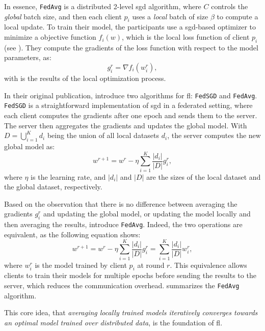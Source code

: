 In essence, \texttt{FedAvg} is a distributed 2-level \gls{sgd} algorithm, where $C$ controls the \emph{global} batch size, and then each client $p_i$ uses a \emph{local} batch of size $\beta$ to compute a local update.
To train their model, the participants use a \gls{sgd}-based optimizer to minimize a objective function $f_i(w)$, which is the local loss function of client $p_i$ (see ).
They compute the gradients of the loss function with respect to the model parameters, as:
\begin{equation}
  g_i^r = \nabla f_i(w_i^r),
\end{equation}
with is the results of the local optimization process.

In their original publication, \textcite{mcmahan_Communicationefficientlearningdeep_2017} introduce two algorithms for \gls{fl}: \texttt{FedSGD} and \texttt{FedAvg}.
\texttt{FedSGD} is a straightforward implementation of \gls{sgd} in a federated setting, where each client computes the gradients after one epoch and sends them to the server.
The server then aggregates the gradients and updates the global model.
With $D=\bigcup_{i=1}^K d_i$ being the union of all local datasets $d_i$, the server computes the new global model as:
\begin{equation}
  w^{r+1} = w^r - \eta \sum_{i=1}^{K} \frac{|d_i|}{|D|} g_i^r,
\end{equation}
where $\eta$ is the learning rate, and $|d_i|$ and $|D|$ are the sizes of the local dataset and the global dataset, respectively.

Based on the observation that there is no difference between averaging the gradients $g_i^r$ and updating the global model, or updating the model locally and then averaging the results, \textcite{mcmahan_Communicationefficientlearningdeep_2017} introduce \texttt{FedAvg}.
Indeed, the two operations are equivalent, as the following equation shows:
\begin{equation}
  w^{r+1} = w^r - \eta \sum_{i=1}^{K} \frac{|d_i|}{|D|} g_i^r = \sum_{i=1}^{K} \frac{|d_i|}{|D|} w_i^r,
\end{equation}
where $w_i^r$ is the model trained by client $p_i$ at round $r$.
This equivalence allows clients to train their models for multiple epochs before sending the results to the server, which reduces the communication overhead.
 summarizes the \texttt{FedAvg} algorithm.

This core idea, that \emph{averaging locally trained models iteratively converges towards an optimal model trained over distributed data}, is the foundation of \gls{fl}.

